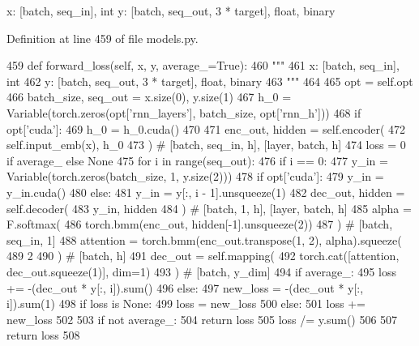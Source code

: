 \begin{DoxyVerb}x: [batch, seq_in], int
y: [batch, seq_out, 3 * target], float, binary
\end{DoxyVerb}
 

Definition at line 459 of file models.\+py.


\begin{DoxyCode}
459     \textcolor{keyword}{def }forward\_loss(self, x, y, average\_=True):
460         \textcolor{stringliteral}{"""}
461 \textcolor{stringliteral}{        x: [batch, seq\_in], int}
462 \textcolor{stringliteral}{        y: [batch, seq\_out, 3 * target], float, binary}
463 \textcolor{stringliteral}{        """}
464 
465         opt = self.opt
466         batch\_size, seq\_out = x.size(0), y.size(1)
467         h\_0 = Variable(torch.zeros(opt[\textcolor{stringliteral}{'rnn\_layers'}], batch\_size, opt[\textcolor{stringliteral}{'rnn\_h'}]))
468         \textcolor{keywordflow}{if} opt[\textcolor{stringliteral}{'cuda'}]:
469             h\_0 = h\_0.cuda()
470 
471         enc\_out, hidden = self.encoder(
472             self.input\_emb(x), h\_0
473         )  \textcolor{comment}{# [batch, seq\_in, h], [layer, batch, h]}
474         loss = 0 \textcolor{keywordflow}{if} average\_ \textcolor{keywordflow}{else} \textcolor{keywordtype}{None}
475         \textcolor{keywordflow}{for} i \textcolor{keywordflow}{in} range(seq\_out):
476             \textcolor{keywordflow}{if} i == 0:
477                 y\_in = Variable(torch.zeros(batch\_size, 1, y.size(2)))
478                 \textcolor{keywordflow}{if} opt[\textcolor{stringliteral}{'cuda'}]:
479                     y\_in = y\_in.cuda()
480             \textcolor{keywordflow}{else}:
481                 y\_in = y[:, i - 1].unsqueeze(1)
482             dec\_out, hidden = self.decoder(
483                 y\_in, hidden
484             )  \textcolor{comment}{# [batch, 1, h], [layer, batch, h]}
485             alpha = F.softmax(
486                 torch.bmm(enc\_out, hidden[-1].unsqueeze(2))
487             )  \textcolor{comment}{# [batch, seq\_in, 1]}
488             attention = torch.bmm(enc\_out.transpose(1, 2), alpha).squeeze(
489                 2
490             )  \textcolor{comment}{# [batch, h]}
491             dec\_out = self.mapping(
492                 torch.cat([attention, dec\_out.squeeze(1)], dim=1)
493             )  \textcolor{comment}{# [batch, y\_dim]}
494             \textcolor{keywordflow}{if} average\_:
495                 loss += -(dec\_out * y[:, i]).sum()
496             \textcolor{keywordflow}{else}:
497                 new\_loss = -(dec\_out * y[:, i]).sum(1)
498                 \textcolor{keywordflow}{if} loss \textcolor{keywordflow}{is} \textcolor{keywordtype}{None}:
499                     loss = new\_loss
500                 \textcolor{keywordflow}{else}:
501                     loss += new\_loss
502 
503         \textcolor{keywordflow}{if} \textcolor{keywordflow}{not} average\_:
504             \textcolor{keywordflow}{return} loss
505         loss /= y.sum()
506 
507         \textcolor{keywordflow}{return} loss
508 
\end{DoxyCode}
